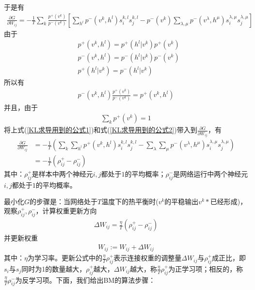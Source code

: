             于是有
            \begin{align*}
            \frac{\partial G}{\partial W_{ij}} = -\frac{1}{T} \sum_{k} \frac{p^+(v^k)}{p^-(v^k)}\left[ \sum_{h^l} p^-(v^k,h^l)s_i^{k,l} s_j^{k,l} - p^-(v^k)\sum_{\lambda,\mu}p^-(v^\lambda,h^\mu)s_i^{\lambda,\mu}s_j^{\lambda,\mu} \right]
            \end{align*}
            由于
            \begin{align*}
            & p^+(v^k,h^l) = p^+(h^l|v^k)p^+(v^k)\\
            & p^-(v^k,h^l) = p^-(h^l|v^k)p^-(v^k)\\
            & p^+(h^l|v^k) = p^-(h^l|v^k)
            \end{align*}
            所以有
            \begin{align}
            \label{KL求导用到的公式1}
            p^-(v^k,h^l)\frac{p^+(v^k)}{p^-(v^k)} = p^+(v^k,h^l)
            \end{align}
            并且，由于
            \begin{align}
            \label{KL求导用到的公式2}
            \sum_kp^+(v^k) = 1
            \end{align}
            将上式(\ref{KL求导用到的公式1})和式(\ref{KL求导用到的公式2})带入到$\frac{\partial G}{\partial W_{ij}}$，有
            \begin{align*}
            \frac{\partial G}{\partial W_{ij}} & = -\frac{1}{T}\left( \sum_{k}\sum_{h^l}p^+(v^k,h^l) s_i^{k,l} s_j^{k,l} - \sum_{\lambda}\sum_{\mu}p^-(v^\lambda,h^\mu)s_i^{\lambda,\mu}s_j^{\lambda,\mu}\right) \\
            & =-\frac{1}{T} \left( \rho_{ij}^+ - \rho_{ij}^- \right)
            \end{align*}
            其中：$\rho_{ij}^+$是样本中两个神经元$i,j$都处于$1$的平均概率；$\rho_{ij}^-$是网络运行中两个神经元$i,j$都处于$1$的平均概率。
            \par
            最小化$G$的步骤是：当网络处于$T$温度下的热平衡时($v^k$的平稳输出$v^k*$已经形成)，观察$\rho_{ij}^+,\rho_{ij}^-$，计算权重更新方向
            \begin{align*}
            \Delta W_{ij} = \frac{\eta}{T}(\rho_{ij}^+ - \rho_{ij}^-)
            \end{align*}
            并更新权重
            \begin{align*}
            W_{ij}:= W_{ij} + \Delta W_{ij}
            \end{align*}
            其中：$\eta$为学习率。更新公式中的$\frac{\eta}{T}\rho_{ij}^+$表示连接权重的调整量$\Delta W_{ij}$与$\rho_{ij}^+$成正比，即$s_i$与$s_j$同时为1的数量越大，$\rho_{ij}^+$越大，$\Delta W_{ij}$越大，称$\frac{\eta}{T}\rho_{ij}^+$为正学习项；相反的，称$\frac{\eta}{T}\rho_{ij}^-$为反学习项。下面，我们给出BM的算法步骤：\\
